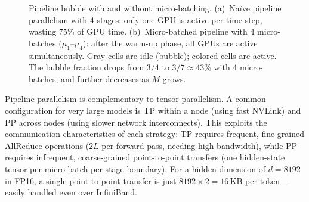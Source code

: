 \begin{figure}[h]
\caption{Pipeline bubble with and without micro-batching. (a)~Na\"ive pipeline parallelism with 4 stages: only one GPU is active per time step, wasting 75\% of GPU time. (b)~Micro-batched pipeline with 4 micro-batches ($\mu_1$--$\mu_4$): after the warm-up phase, all GPUs are active simultaneously. Gray cells are idle (bubble); colored cells are active. The bubble fraction drops from $3/4$ to $3/7 \approx 43\%$ with 4 micro-batches, and further decreases as $M$ grows.}
\label{fig:pipeline-bubble}
\end{figure}

\begin{insightbox}
Pipeline parallelism is complementary to tensor parallelism. A common configuration for very large models is TP within a node (using fast NVLink) and PP across nodes (using slower network interconnects). This exploits the communication characteristics of each strategy: TP requires frequent, fine-grained AllReduce operations ($2L$ per forward pass, needing high bandwidth), while PP requires infrequent, coarse-grained point-to-point transfers (one hidden-state tensor per micro-batch per stage boundary). For a hidden dimension of $d = 8192$ in FP16, a single point-to-point transfer is just $8192 \times 2 = 16$\,KB per token---easily handled even over InfiniBand.
\end{insightbox}

